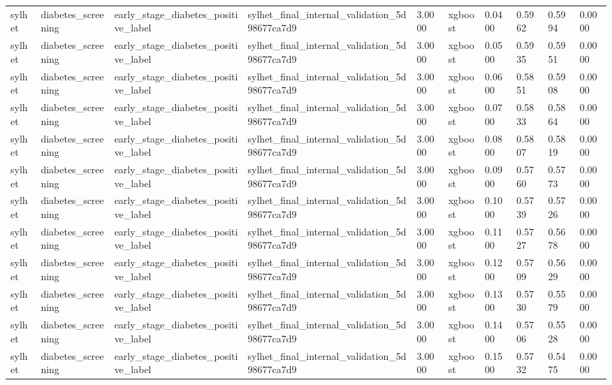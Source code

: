 \begin{tabular}{llllllllll}
sylhet & diabetes\_screening & early\_stage\_diabetes\_positive\_label & sylhet\_final\_internal\_validation\_5d98677ca7d9 & 3.0000 & xgboost & 0.0400 & 0.5962 & 0.5994 & 0.0000 \\
sylhet & diabetes\_screening & early\_stage\_diabetes\_positive\_label & sylhet\_final\_internal\_validation\_5d98677ca7d9 & 3.0000 & xgboost & 0.0500 & 0.5935 & 0.5951 & 0.0000 \\
sylhet & diabetes\_screening & early\_stage\_diabetes\_positive\_label & sylhet\_final\_internal\_validation\_5d98677ca7d9 & 3.0000 & xgboost & 0.0600 & 0.5851 & 0.5908 & 0.0000 \\
sylhet & diabetes\_screening & early\_stage\_diabetes\_positive\_label & sylhet\_final\_internal\_validation\_5d98677ca7d9 & 3.0000 & xgboost & 0.0700 & 0.5833 & 0.5864 & 0.0000 \\
sylhet & diabetes\_screening & early\_stage\_diabetes\_positive\_label & sylhet\_final\_internal\_validation\_5d98677ca7d9 & 3.0000 & xgboost & 0.0800 & 0.5807 & 0.5819 & 0.0000 \\
sylhet & diabetes\_screening & early\_stage\_diabetes\_positive\_label & sylhet\_final\_internal\_validation\_5d98677ca7d9 & 3.0000 & xgboost & 0.0900 & 0.5760 & 0.5773 & 0.0000 \\
sylhet & diabetes\_screening & early\_stage\_diabetes\_positive\_label & sylhet\_final\_internal\_validation\_5d98677ca7d9 & 3.0000 & xgboost & 0.1000 & 0.5739 & 0.5726 & 0.0000 \\
sylhet & diabetes\_screening & early\_stage\_diabetes\_positive\_label & sylhet\_final\_internal\_validation\_5d98677ca7d9 & 3.0000 & xgboost & 0.1100 & 0.5727 & 0.5678 & 0.0000 \\
sylhet & diabetes\_screening & early\_stage\_diabetes\_positive\_label & sylhet\_final\_internal\_validation\_5d98677ca7d9 & 3.0000 & xgboost & 0.1200 & 0.5709 & 0.5629 & 0.0000 \\
sylhet & diabetes\_screening & early\_stage\_diabetes\_positive\_label & sylhet\_final\_internal\_validation\_5d98677ca7d9 & 3.0000 & xgboost & 0.1300 & 0.5730 & 0.5579 & 0.0000 \\
sylhet & diabetes\_screening & early\_stage\_diabetes\_positive\_label & sylhet\_final\_internal\_validation\_5d98677ca7d9 & 3.0000 & xgboost & 0.1400 & 0.5706 & 0.5528 & 0.0000 \\
sylhet & diabetes\_screening & early\_stage\_diabetes\_positive\_label & sylhet\_final\_internal\_validation\_5d98677ca7d9 & 3.0000 & xgboost & 0.1500 & 0.5732 & 0.5475 & 0.0000 \\

\end{tabular}

